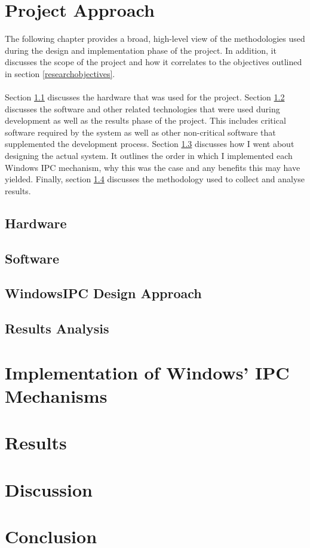 \documentclass[12pt] {newrucsthesis}    %
\begin{document}
  \chapter{Project Approach}
    The following chapter provides a broad, high-level view of the methodologies used during the
    design and implementation phase of the project. In addition, it discusses the scope of the project
    and how it correlates to the objectives outlined in section \ref{researchobjectives}.
    \\\\
    Section \ref{hardwareused} discusses the hardware that was used for the project.
    Section \ref{softwareused} discusses the software and other related technologies that were used
    during development as well as the results phase of the project. This includes critical software
    required by the system as well as other non-critical software that supplemented the development process.
    Section \ref{devapproach} discusses how I went about designing the actual system. It outlines the
    order in which I implemented each Windows IPC mechanism, why this was the case and any benefits this
    may have yielded. Finally, section \ref{results} discusses the methodology used to collect and analyse results.
    \section{Hardware} \label{hardwareused} %
    \section{Software} \label{softwareused}%
    \section{WindowsIPC Design Approach} \label{devapproach}
    \section{Results Analysis} \label{results}

  \chapter{Implementation of Windows' IPC Mechanisms}

  \chapter{Results}

  \chapter{Discussion}

  \chapter{Conclusion}


\end{document}
